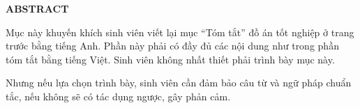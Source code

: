 \documentclass[../main.tex]{subfiles}
\begin{document}
\begin{center}
    \Large{\textbf{ABSTRACT}}\\
\end{center}
\vspace{1cm}
Mục này khuyến khích sinh viên viết lại mục “Tóm tắt” đồ án tốt nghiệp ở trang trước bằng tiếng Anh. Phần này phải có đầy đủ các nội dung như trong phần tóm tắt bằng tiếng Việt.
Sinh viên không nhất thiết phải trình bày mục này. 

Nhưng nếu lựa chọn trình bày, sinh viên cần đảm bảo câu từ và ngữ pháp chuẩn tắc, nếu không sẽ có tác dụng ngược, gây phản cảm.
\end{document}

